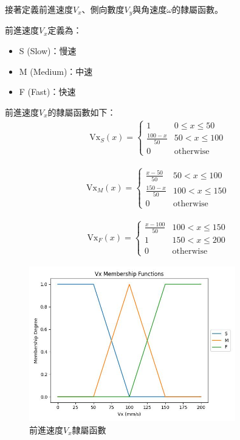 \documentclass[12pt]{article}       %
\begin{document}
接著定義前進速度$V_{x}$、側向數度$V_{y}$與角速度$\omega$的隸屬函數。

前進速度$V_{x}$定義為：
\begin{itemize}
    \item S (Slow)：慢速
    \item M (Medium)：中速
    \item F (Fast)：快速
\end{itemize}

前進速度$V_{x}$的隸屬函數如下：
\begin{align}
    \text{Vx}_{S}(x) = 
    \begin{cases}
    1 & 0 \le x \le 50 \\
    \frac{100 - x}{50} & 50 < x \le 100 \\
    0 & \text{otherwise}
    \end{cases}
\end{align}

\begin{align}
    \text{Vx}_{M}(x) = 
    \begin{cases}
    \frac{x - 50}{50} & 50 < x \le 100 \\
    \frac{150 - x}{50} & 100 < x \le 150 \\
    0 & \text{otherwise}
    \end{cases}
\end{align}

\begin{align}
    \text{Vx}_{F}(x) = 
    \begin{cases}
    \frac{x - 100}{50} & 100 < x \le 150 \\
    1 & 150 < x \le 200 \\
    0 & \text{otherwise}
    \end{cases}    
\end{align}

\begin{figure}[H]
    \centering
    \includegraphics[width=0.8\textwidth]{22.jpg}     %
    \caption{前進速度$V_{x}$隸屬函數}    %
    \label{fig:22}    %
\end{figure}
\end{document}
